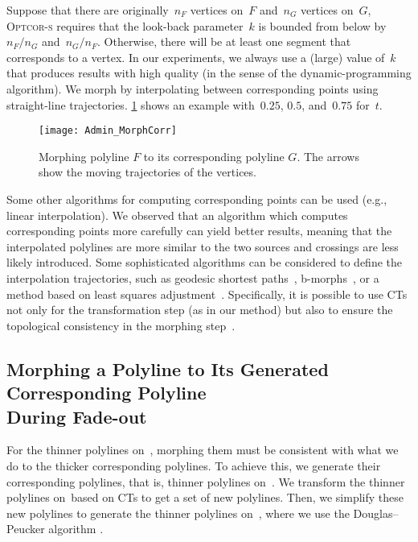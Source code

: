 Suppose that there are originally~$n_F$ vertices on~$F$ 
and~$n_G$ vertices on~$G$,
\textsc{Optcor-s} requires that 
the look-back parameter~$k$ is bounded from below 
by~$n_F/n_G$ and~$n_G/n_F$. 
Otherwise, there will be at least one segment 
that corresponds to a vertex. 
In our experiments, we always use a (large) value of~$k$ 
that produces results with high quality 
(in the sense of the dynamic-programming algorithm). 
We morph by interpolating between corresponding points using
straight-line trajectories. 
\fig\ref{fig:Admin_MorphCorr} shows an example
with~$0.25$, $0.5$, and~$0.75$ for~$t$.

\begin{figure}[tb]
\centering
\texttt{[image: Admin\_MorphCorr]}
\caption{Morphing polyline $F$ to its corresponding 
    polyline $G$. 
    The arrows show the moving trajectories of the vertices.}
\label{fig:Admin_MorphCorr}
\end{figure}

Some other algorithms for computing corresponding points 
can be used (e.g., linear interpolation). 
We observed that an algorithm which
computes corresponding points more carefully 
can yield better results, 
meaning that the interpolated polylines 
are more similar to the two sources and
crossings are less likely introduced.
Some sophisticated algorithms can be 
considered to define the interpolation trajectories, 
such as geodesic shortest paths~\parencite{Bereg2005}, 
b-morphs~\parencite{Whited2011BallMorph}, 
or a method based on 
least squares adjustment~\parencite{Peng2013LSA}. 
Specifically, it is possible to use CTs
not only for the transformation step (as in our method) 
but also to ensure the topological consistency 
in the morphing step~\parencite[see][]
{GotsmanS2001,Surazhsky2003Intrinsic,Surazhsky2004HighQuality}.

\subsection[Morphing a Polyline to 
Its Generated Corresponding Polyline] 
{Morphing a Polyline to 
Its Generated Corresponding Polyline \\ During Fade-out}
\label{sec:Admin_MorphSinglePolylines}

For the thinner polylines on~\ml, 
morphing them must be consistent with 
what we do to the thicker corresponding polylines. 
To achieve this, we generate their corresponding polylines, 
that is, thinner polylines on~\ms. 
We transform the thinner polylines on~\ml based on CTs
to get a set of new polylines.
Then, we simplify these new polylines 
to generate the thinner polylines on~\ms,
where we use the Douglas--Peucker algorithm
\parencite{Douglas1973}.


